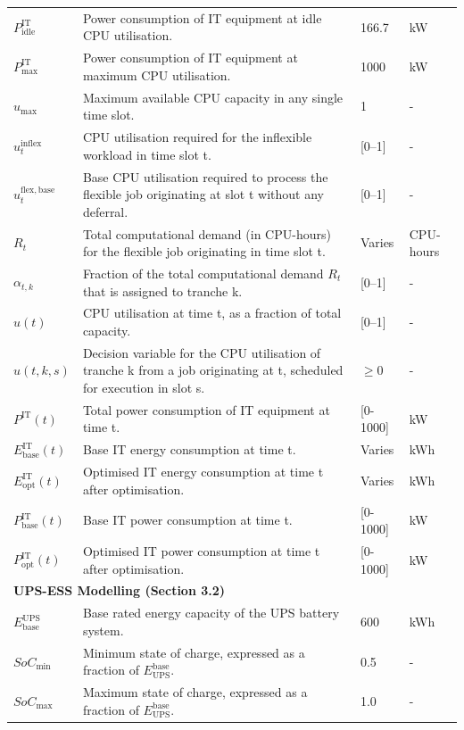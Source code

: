 \documentclass[lettersize,journal]{IEEEtran}
\begin{document}
{{\begin{longtable}{p{} p{} p{} p{}}
$P^{\mathrm{IT}}_{\mathrm{idle}}$ & Power consumption of IT equipment at idle CPU utilisation. & 166.7 &kW \\
$P^{\mathrm{IT}}_{\mathrm{max}}$ & Power consumption of IT equipment at maximum CPU utilisation. & 1000 &kW \\
$u_{\max}$ & Maximum available CPU capacity in any single time slot. & 1 & - \\
$u_t^{\mathrm{inflex}}$ & CPU utilisation required for the inflexible workload in time slot t. & [0–1] & - \\
$u_t^{\mathrm{flex,base}}$ & Base CPU utilisation required to process the flexible job originating at slot t without any deferral. & [0–1] & - \\
$R_t$ & Total computational demand (in CPU-hours) for the flexible job originating in time slot t. & Varies & CPU-hours \\
$\alpha_{t,k}$ & Fraction of the total computational demand $R_t$ that is assigned to tranche k. & [0–1] & - \\
$u(t)$ & CPU utilisation at time t, as a fraction of total capacity. & [0–1] & - \\
$u(t,k,s)$ & Decision variable for the CPU utilisation of tranche k from a job originating at t, scheduled for execution in slot s. & $\geq 0$ & - \\
$P^{\mathrm{IT}}(t)$ & Total power consumption of IT equipment at time t. & [0-1000] &kW \\
$E^{\mathrm{IT}}_{\mathrm{base}}(t)$ & Base IT energy consumption at time t. & Varies &kWh \\
$E^{\mathrm{IT}}_{\mathrm{opt}}(t)$ & Optimised IT energy consumption at time t after optimisation. & Varies &kWh \\
$P^{\mathrm{IT}}_{\mathrm{base}}(t)$ & Base IT power consumption at time t. & [0-1000] &kW \\
$P^{\mathrm{IT}}_{\mathrm{opt}}(t)$ & Optimised IT power consumption at time t after optimisation. & [0-1000] &kW \\
\midrule
\multicolumn{4}{l}{\textbf{UPS-ESS Modelling (Section 3.2)}} \\
\midrule
$E^{\mathrm{UPS}}_{\mathrm{base}}$ & Base rated energy capacity of the UPS battery system. & 600 &kWh \\
$SoC_{\min}$ & Minimum state of charge, expressed as a fraction of $E_{\mathrm{UPS}}^{\mathrm{base}}$. & 0.5 & - \\
$SoC_{\max}$ & Maximum state of charge, expressed as a fraction of $E_{\mathrm{UPS}}^{\mathrm{base}}$. & 1.0 & - \\

\end{longtable}}}
\end{document}
